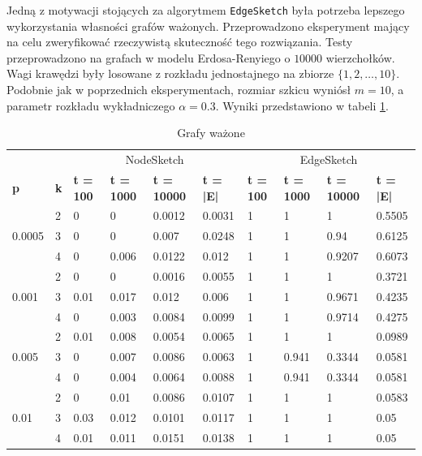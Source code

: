     Jedną z motywacji stojących za algorytmem \texttt{EdgeSketch} była potrzeba lepszego wykorzystania własności grafów ważonych.  Przeprowadzono eksperyment mający na celu zweryfikować rzeczywistą skuteczność tego rozwiązania. Testy przeprowadzono na grafach w modelu Erdosa-Renyiego o $10000$ wierzchołków. Wagi krawędzi były losowane z rozkładu jednostajnego na zbiorze $\{1, 2, \ldots, 10\}$. Podobnie jak w poprzednich eksperymentach, rozmiar szkicu wyniósł $m = 10$, a parametr rozkładu wykładniczego $\alpha = 0.3$. Wyniki przedstawiono w tabeli \ref{tab:weighted_graphs}.

    \begin{table}[!ht]
        \small
        \centering
        \begin{tabular}{|l|l|l|l|l|l|l|l|l|l|}
        \hline
        & & \multicolumn{4}{c|}{NodeSketch} & \multicolumn{4}{c|}{EdgeSketch} \\ \cline{1-10}
                \textbf{p} & \textbf{k} & \textbf{t = 100} & \textbf{t = 1000} & \textbf{t = 10000} & \textbf{t = |E|} & \textbf{t = 100} & \textbf{t = 1000} & \textbf{t = 10000} & \textbf{t = |E|} \\ \hline\hline
            \multirow{3}{*}{0.0005} & 2 & 0 & 0 & 0.0012 & 0.0031 & 1 & 1 & 1 & 0.5505 \\ \cline{2-10}
            & 3 & 0 & 0 & 0.007 & 0.0248 & 1 & 1 & 0.94 & 0.6125 \\ \cline{2-10}
            & 4 & 0 & 0.006 & 0.0122 & 0.012 & 1 & 1 & 0.9207 & 0.6073 \\ \hline\hline
            \multirow{3}{*}{0.001} & 2 & 0 & 0 & 0.0016 & 0.0055 & 1 & 1 & 1 & 0.3721 \\ \cline{2-10}
            & 3 & 0.01 & 0.017 & 0.012 & 0.006 & 1 & 1 & 0.9671 & 0.4235 \\ \cline{2-10}
            & 4 & 0 & 0.003 & 0.0084 & 0.0099 & 1 & 1 & 0.9714 & 0.4275 \\ \hline\hline
            \multirow{3}{*}{0.005} & 2 & 0.01 & 0.008 & 0.0054 & 0.0065 & 1 & 1 & 1 & 0.0989 \\ \cline{2-10}
            & 3 & 0 & 0.007 & 0.0086 & 0.0063 & 1 & 0.941 & 0.3344 & 0.0581 \\ \cline{2-10}
            & 4 & 0 & 0.004 & 0.0064 & 0.0088 & 1 & 0.941 & 0.3344 & 0.0581 \\ \hline\hline
            \multirow{3}{*}{0.01} & 2 & 0 & 0.01 & 0.0086 & 0.0107 & 1 & 1 & 1 & 0.0583 \\ \cline{2-10}
            & 3 & 0.03 & 0.012 & 0.0101 & 0.0117 & 1 & 1 & 1 & 0.05 \\ \cline{2-10}
            & 4 & 0.01 & 0.011 & 0.0151 & 0.0138 & 1 & 1 & 1 & 0.05 \\ \hline
        \end{tabular}
        \caption{Grafy ważone}
        \label{tab:weighted_graphs}
    \end{table}

